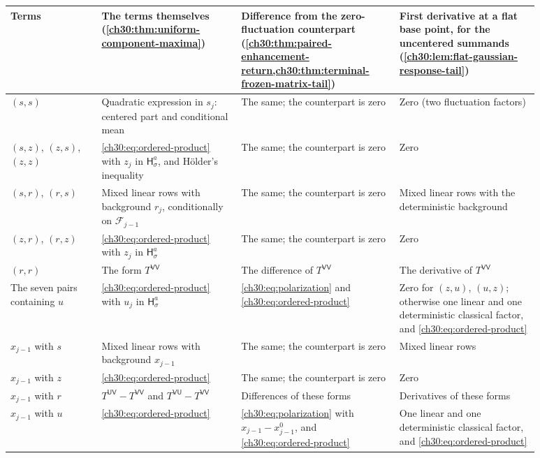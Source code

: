 \begin{table}[ht]
\centering\small
\begin{tabular}{p{0.15\linewidth}p{0.235\linewidth}p{0.265\linewidth}p{0.235\linewidth}}
\toprule
Terms & The terms themselves (\cref{ch30:thm:uniform-component-maxima}) & Difference from the zero-fluctuation counterpart (\cref{ch30:thm:paired-enhancement-return,ch30:thm:terminal-frozen-matrix-tail}) & First derivative at a flat base point, for the uncentered summands (\cref{ch30:lem:flat-gaussian-response-tail})\\\midrule
$(s,s)$ & Quadratic expression in $s_j$: centered part and conditional mean & The same; the counterpart is zero & Zero (two fluctuation factors)\\[3pt]
$(s,z)$, $(z,s)$, $(z,z)$ & \eqref{ch30:eq:ordered-product} with $z_j$ in $\mathsf H_\sigma^a$, and H\"older's inequality & The same; the counterpart is zero & Zero\\[3pt]
$(s,r)$, $(r,s)$ & Mixed linear rows with background $r_j$, conditionally on $\mathcal F_{j-1}$ & The same; the counterpart is zero & Mixed linear rows with the deterministic background\\[3pt]
$(z,r)$, $(r,z)$ & \eqref{ch30:eq:ordered-product} with $z_j$ in $\mathsf H_\sigma^a$ & The same; the counterpart is zero & Zero\\[3pt]
$(r,r)$ & The form $T^{\mathsf{VV}}$ & The difference of $T^{\mathsf{VV}}$ & The derivative of $T^{\mathsf{VV}}$\\[3pt]
The seven pairs containing $u$ & \eqref{ch30:eq:ordered-product} with $u_j$ in $\mathsf H_\sigma^a$ & \eqref{ch30:eq:polarization} and \eqref{ch30:eq:ordered-product} & Zero for $(z,u)$, $(u,z)$; otherwise one linear and one deterministic classical factor, and \eqref{ch30:eq:ordered-product}\\[3pt]
$x_{j-1}$ with $s$ & Mixed linear rows with background $x_{j-1}$ & The same; the counterpart is zero & Mixed linear rows\\[3pt]
$x_{j-1}$ with $z$ & \eqref{ch30:eq:ordered-product} & The same; the counterpart is zero & Zero\\[3pt]
$x_{j-1}$ with $r$ & $T^{\mathsf{UV}}-T^{\mathsf{VV}}$ and $T^{\mathsf{VU}}-T^{\mathsf{VV}}$ & Differences of these forms & Derivatives of these forms\\[3pt]
$x_{j-1}$ with $u$ & \eqref{ch30:eq:ordered-product} & \eqref{ch30:eq:polarization} with $x_{j-1}-x^0_{j-1}$, and \eqref{ch30:eq:ordered-product} & One linear and one deterministic classical factor, and \eqref{ch30:eq:ordered-product}\\

\end{tabular}
\end{table}
